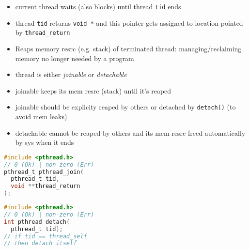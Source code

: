 \begin{minipage}{0.5\linewidth}
  \flushleft
  \begin{itemize}[label=]
  \item current thread waits (also blocks) until thread \texttt{tid} ends
  \item thread \texttt{tid} returns \texttt{void *} and this pointer gets assigned to location pointed by \texttt{thread\_return}
  \item Reaps memory resrc (e.g. stack) of terminated thread: managing/reclaiming memory no longer needed by a program
  \end{itemize}
\end{minipage}
\begin{minipage}{0.5\linewidth}
  \flushleft
  \begin{itemize}[label=]
  \item thread is either \emph{joinable} or \emph{detachable}
  \item joinable keeps its mem resrc (stack) until it's reaped
  \item joinable should be explicity reaped by others or detached by \texttt{detach()} (to avoid mem leaks)
  \item detachable cannot be reaped by others and its mem resrc freed automatically by sys when it ends
  \end{itemize}
\end{minipage}
\begin{minipage}{0.5\linewidth}
\begin{lstlisting}[language=C,xrightmargin=2pt]
#include <pthread.h>
// 0 (Ok) | non-zero (Err)
pthread_t pthread_join(
  pthread_t tid,
  void **thread_return
);
\end{lstlisting}
\end{minipage}
\begin{minipage}{0.5\linewidth}
\begin{lstlisting}[language=C,xleftmargin=4pt,xrightmargin=2pt]
#include <pthread.h>
// 0 (Ok) | non-zero (Err)
int pthread_detach(
  pthread_t tid);
// if tid == thread_self
// then detach itself
\end{lstlisting}
\end{minipage}
